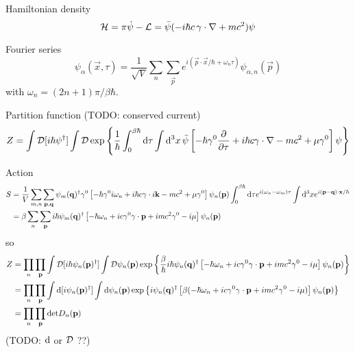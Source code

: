 Hamiltonian density
\begin{equation}
	\mathcal{H} = \pi \dot\psi - \mathcal{L} = \bar\psi ( -i \hbar c \, \mathbf{\gamma} \cdot \mathbf{\nabla} + m c^2 ) \psi
\end{equation}

Fourier series
\begin{equation}
	\psi_\alpha(\vec{x}, \tau) = \frac{1}{\sqrt{V}} \sum_n \sum_\vec{p} e^{i (\vec{p} \cdot \vec{x} / \hbar + \omega_n \tau)} \psi_{\alpha, n}(\vec{p})
\end{equation}
with $\omega_n = (2n+1) \pi / \beta \hbar$.

Partition function
(TODO: conserved current)
\begin{equation}
	Z = \int \mathcal{D} [i \hbar \psi^\dagger] \int \mathcal{D} 
	    \exp \left\{ \frac{1}{\hbar} \int_0^{\beta \hbar} \mathop{}\!\mathrm{d} \tau \int \mathop{}\!\mathrm{d}^3 x \, \bar\psi \left[ -\hbar \gamma^0 \pdv{}{\tau} + i \hbar c \mathbf{\gamma} \cdot \mathbf{\nabla} - mc^2 + \mu \gamma^0 \right] \psi \right\}
\end{equation}

Action
\begin{equation}
\begin{split}
	S & = \frac{1}{V} \sum_{m,n} \sum_{\mathbf{p},\mathbf{q}}         \psi_m(\mathbf{q})^\dagger \gamma^0 \left[ -\hbar \gamma^0 i \omega_n + i \hbar c \mathbf{\gamma} \cdot i \mathbf{k} - m c^2 + \mu \gamma^0 \right] \psi_n(\mathbf{p}) \int_0^{\beta \hbar} \mathop{}\!\mathrm{d} \tau e^{i(\omega_n-\omega_m)\tau} \int \mathop{}\!\mathrm{d}^3 x e^{i(\mathbf{p}-\mathbf{q})\cdot\mathbf{x}/\hbar} \\
	  & = \beta       \sum_{n}   \sum_{\mathbf{p}}         i \hbar \psi_m(\mathbf{q})^\dagger          \left[ -\hbar \omega_n + i c \gamma^0 \mathbf{\gamma} \cdot \mathbf{p} + i m c^2 \gamma^0 - i \mu \right] \psi_n(\mathbf{p}) \\
\end{split}
\end{equation}
so
\begin{equation}
\begin{split}
	Z & = \prod_n \prod_{\mathbf{p}} \int \mathcal{D} [i \hbar \psi_n(\mathbf{p})^\dagger] \int \mathcal{D} \psi_n(\mathbf{p})
	      \exp \left\{ \frac{\beta}{\hbar} i \hbar \psi_n(\mathbf{q})^\dagger \left[ -\hbar \omega_n + i c \gamma^0 \mathbf{\gamma} \cdot \mathbf{p} + i mc^2 \gamma^0 - i \mu \right] \psi_n(\mathbf{p}) \right\} \\
	  & = \prod_n \prod_{\mathbf{p}} \int \mathop{}\!\mathrm{d} [i \psi_n(\mathbf{p})^\dagger] \int \mathop{}\!\mathrm{d} \psi_n(\mathbf{p})
	      \exp \left\{ i \psi_n(\mathbf{q})^\dagger \left[ \beta( -\hbar \omega_n + i c \gamma^0 \mathbf{\gamma} \cdot \mathbf{p} + i mc^2 \gamma^0 - i \mu ) \right] \psi_n(\mathbf{p}) \right\} \\
	  & = \prod_n \prod_{\mathbf{p}} \text{det} D_n(\mathbf{p})
\end{split}
\end{equation}
(TODO: $\mathop{}\!\mathrm{d}$ or $\mathcal{D}$ ??)

